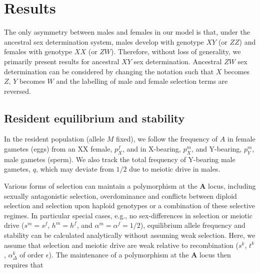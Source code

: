 \documentclass[12pt]{article}
\begin{document}

\section*{Results}

The only asymmetry between males and females in our model is that, under the ancestral sex determination system, males develop with genotype $XY$ (or $ZZ$) and females with genotype $XX$ (or $ZW$). 
Therefore, without loss of generality, we primarily present results for ancestral $XY$ sex determination. 
Ancestral $ZW$ sex determination can be considered by changing the notation such that $X$ becomes $Z$, $Y$ becomes $W$ and the labelling of male and female selection terms are reversed. 

\subsection*{Resident equilibrium and stability}
In the resident population (allele $M$ fixed), we follow the frequency of $A$ in female gametes (eggs) from an XX female, $p^f_X$, and in X-bearing, $p^m_X$, and Y-bearing, $p^m_Y$, male gametes (sperm). 
We also track the total frequency of Y-bearing male gametes, $q$, which may deviate from $1/2$ due to meiotic drive in males. 

Various forms of selection can maintain a polymorphism at the \textbf{A} locus, including sexually antagonistic selection, overdominance and conflicts between diploid selection and selection upon haploid genotypes \citep[ploidally antagonistic selection,][]{Immler:2012tl} or a combination of these selective regimes. 
In particular special cases, e.g., no sex-differences in selection or meiotic drive ($s^m=s^f$, $h^m=h^f$, and $\alpha^m=\alpha^f=1/2$), equilibrium allele frequency and stability can be calculated analytically without assuming weak selection. 
Here, we assume that selection and meiotic drive are weak relative to recombination ($s^k$, $t^k$, $\alpha_{\Delta}^k$ of order $\epsilon$). 
The maintenance of a polymorphism at the \textbf{A} locus then requires that
\end{document}
